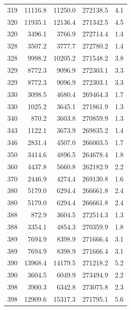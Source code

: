 \begin{longtable}{rrrrr}
    319 & \num{11116.8} & \num{11250.0} & \num{272138.5} & 4.1 \\
    320 & \num{11935.1} & \num{12136.4} & \num{271342.5} & 4.5 \\
    320 & \num{3496.1} & \num{3766.9} & \num{272714.4} & 1.4 \\
    328 & \num{3507.2} & \num{3777.7} & \num{272780.2} & 1.4 \\
    328 & \num{9998.2} & \num{10205.2} & \num{271548.2} & 3.8 \\
    329 & \num{8772.3} & \num{9096.9} & \num{272303.1} & 3.3 \\
    329 & \num{8772.3} & \num{9096.9} & \num{272303.1} & 3.3 \\
    330 & \num{3098.5} & \num{4680.4} & \num{269464.3} & 1.7 \\
    330 & \num{1025.2} & \num{3645.1} & \num{271861.9} & 1.3 \\
    340 & \num{870.2} & \num{3603.8} & \num{270859.9} & 1.3 \\
    343 & \num{1122.1} & \num{3673.9} & \num{269835.2} & 1.4 \\
    346 & \num{2831.4} & \num{4507.0} & \num{266003.5} & 1.7 \\
    350 & \num{3414.6} & \num{4896.5} & \num{264678.4} & 1.8 \\
    360 & \num{4437.8} & \num{5660.8} & \num{262182.9} & 2.2 \\
    370 & \num{2446.9} & \num{4274.4} & \num{269130.8} & 1.6 \\
    380 & \num{5179.0} & \num{6294.4} & \num{266661.8} & 2.4 \\
    380 & \num{5179.0} & \num{6294.4} & \num{266661.8} & 2.4 \\
    388 & \num{872.9} & \num{3604.5} & \num{272514.3} & 1.3 \\
    388 & \num{3354.1} & \num{4854.3} & \num{270359.9} & 1.8 \\
    389 & \num{7694.9} & \num{8398.9} & \num{271666.4} & 3.1 \\
    389 & \num{7694.9} & \num{8398.9} & \num{271666.4} & 3.1 \\
    390 & \num{13968.4} & \num{14179.5} & \num{271218.2} & 5.2 \\
    390 & \num{3604.5} & \num{6049.9} & \num{273494.9} & 2.2 \\
    398 & \num{3900.3} & \num{6342.8} & \num{273075.8} & 2.3 \\
    398 & \num{12909.6} & \num{15317.3} & \num{271795.1} & 5.6 \\

\end{longtable}
